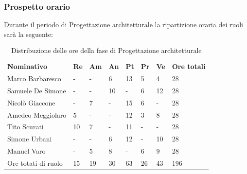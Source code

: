     \subsubsection{Prospetto orario}
    Durante il periodo di Progettazione architetturale la ripartizione oraria dei ruoli sarà la seguente:
        \begin{center}
            \begin{table}[ht!]
                \centering
                \caption{Distribuzione delle ore della fase di Progettazione architetturale}
                \vspace{5px}
                \renewcommand{\arraystretch}{1.8}
                \begin{tabular}{p{100px} p{20px} p{20px} p{20px} p{20px} p{20px} p{20px} p{50px} }
                    \rowcolor{logo!70} \textbf{Nominativo} & \textbf{Re} & \textbf{Am} & \textbf{An} & \textbf{Pt} & \textbf{Pr} & \textbf{Ve} & \textbf{Ore totali}\\
                    Marco Barbaresco & - & - & 6 & 13 & 5 & 4 & 28\\
                    Samuele De Simone & - & - & 10 & - & 6 & 12 & 28\\
                    Nicolò Giaccone & - & 7 & - & 15 & 6 & - & 28\\
                    Amedeo Meggiolaro & 5 & - & - & 12 & 3 & 8 & 28\\
                    Tito Scurati & 10 & 7 & - & 11 & - & - & 28\\
                    Simone Urbani & - & - & 6 & 12 & - & 10 & 28\\
                    Manuel Varo & - & 5 & 8 & - & 6 & 9 & 28\\
                    Ore totati di ruolo & 15 & 19 & 30 & 63 & 26 & 43 & 196\\
                \end{tabular}
            \end{table}
        \end{center}
        \pagebreak
        
